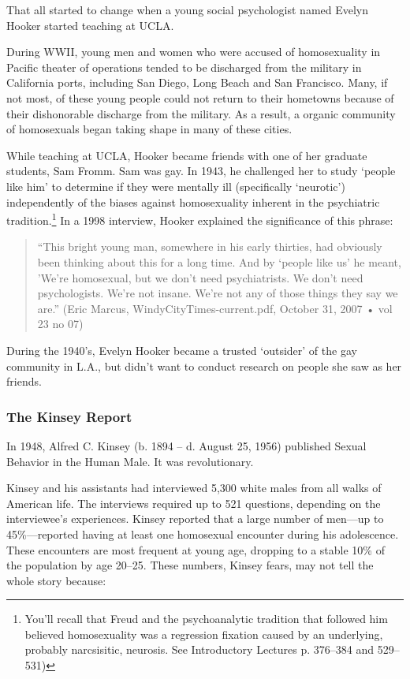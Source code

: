 That all started to change when a young social psychologist named Evelyn Hooker started teaching at UCLA.

During WWII, young men and women who were accused of homosexuality in Pacific theater of operations tended to be discharged from the military in California ports, including San Diego, Long Beach and San Francisco. Many, if not most, of these young people could not return to their hometowns because of their dishonorable discharge from the military. As a result, a organic community of homosexuals began taking shape in many of these cities.

While teaching at UCLA, Hooker became friends with one of her graduate students, Sam Fromm. Sam was gay. In 1943, he challenged her to study `people like him' to determine if they were mentally ill (specifically `neurotic') independently of the biases against homosexuality inherent in the psychiatric tradition.\footnote{You'll recall that Freud and the psychoanalytic tradition that followed him believed homosexuality was a regression fixation caused by an underlying, probably narcsisitic, neurosis. See Introductory Lectures p. 376--384 and 529--531)} In a 1998 interview, Hooker explained the significance of this phrase:

\begin{quote}

``This bright young man, somewhere in his early thirties, had obviously been thinking about this for a long time. And by `people like us' he meant, 'We're homosexual, but we don't need psychiatrists. We don't need psychologists. We're not insane. We're not any of those things they say we are.'' (Eric Marcus, WindyCityTimes-current.pdf, October 31, 2007 • vol 23 no 07)
\end{quote}

During the 1940's, Evelyn Hooker became a trusted `outsider' of the gay community in L.A., but didn't want to conduct research on people she saw as her friends.

\subsubsection{The Kinsey Report}
\label{thekinseyreport}

In 1948, Alfred C. Kinsey (b. 1894 – d. August 25, 1956) published Sexual Behavior in the Human Male. It was revolutionary.

Kinsey and his assistants had interviewed 5,300 white males from all walks of American life. The interviews required up to 521 questions, depending on the interviewee's experiences. Kinsey reported that a large number of men---up to 45\%---reported having at least one homosexual encounter during his adolescence. These encounters are most frequent at young age, dropping to a stable 10\% of the population by age 20--25. These numbers, Kinsey fears, may not tell the whole story because:

